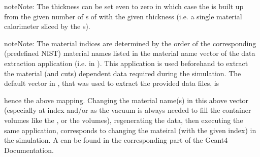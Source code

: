 \documentclass[letterpaper,10pt,english]{sphinxmanual}
\begin{document}
\begin{fulllineitems}
\begin{sphinxadmonition}{note}{Note:}
\sphinxAtStartPar
The  thickness can be set even to zero in which case the  is built up from the given number of s of  with the given thickness (i.e. a single material calorimeter sliced by the s).
\end{sphinxadmonition}

\begin{sphinxadmonition}{note}{Note:}
\sphinxAtStartPar
The material indices are determined by the order of the corresponding  (predefined NIST) material names listed in the material name vector of the data extraction application (i.e. in ). This application is used beforehand to extract the material (and cuts) dependent data required during the simulation. The default vector in , that was used to extract the provided data files, is 
\begin{sphinxVerbatim}[commandchars=\\\{\}]
      
    
\end{sphinxVerbatim}
 hence the above  mapping. Changing the material name(s) in this above vector (especially at index  and/or  as the vacuum is always needed to fill the container volumes like the ,  or the  volumes), regenerating the data, then executing the same  application, corresponds to changing the mateiral (with the given index) in the simulation. A  can be found in the corresponding part of the Geant4 Documentation.
\end{sphinxadmonition}



\end{fulllineitems}
\end{document}
